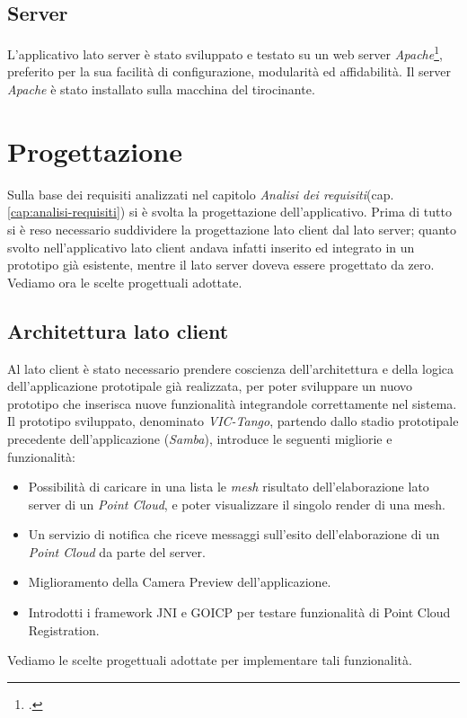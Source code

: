 \subsection{Server}
L'applicativo lato server è stato sviluppato e testato su un web server \emph{Apache}\footcite{https://httpd.apache.org/}, preferito per la sua facilità di configurazione, modularità ed affidabilità. Il server \emph{Apache} è stato installato sulla macchina del tirocinante.

\section{Progettazione}
\label{sec:progettazione}
Sulla base dei requisiti analizzati nel capitolo \emph{Analisi dei requisiti}(cap. \ref{cap:analisi-requisiti}) si è svolta la progettazione dell'applicativo. Prima di tutto si è reso necessario suddividere la progettazione lato client dal lato server; quanto svolto nell'applicativo lato client andava infatti inserito ed integrato in un prototipo già esistente, mentre il lato server doveva essere progettato da zero.
Vediamo ora le scelte progettuali adottate.

\subsection{Architettura lato client}
Al lato client è stato necessario prendere coscienza dell'architettura e della logica dell'applicazione prototipale già realizzata, per poter sviluppare un nuovo prototipo che inserisca nuove funzionalità integrandole correttamente nel sistema. 
Il prototipo sviluppato, denominato \emph{VIC-Tango}, partendo dallo stadio prototipale precedente dell'applicazione (\emph{Samba}), introduce le seguenti migliorie e funzionalità:
\begin{itemize}
\item Possibilità di caricare in una lista le \emph{mesh} risultato dell'elaborazione lato server di un \emph{Point Cloud}, e poter visualizzare il singolo render di una mesh.
\item Un servizio di notifica che riceve messaggi sull'esito dell'elaborazione di un \emph{Point Cloud} da parte del server.
\item Miglioramento della Camera Preview dell'applicazione.
\item Introdotti i framework JNI e GOICP per testare funzionalità di Point Cloud Registration.
\end{itemize}
Vediamo le scelte progettuali adottate per implementare tali funzionalità.

